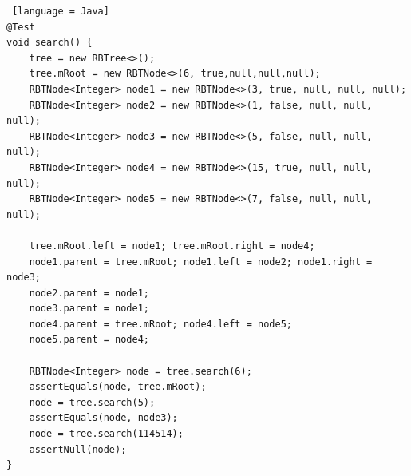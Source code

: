 \documentclass[12pt, a4paper, oneside]{ctexart}
\begin{document}
\begin{lstlisting} [language = Java]
@Test
void search() {
    tree = new RBTree<>();
    tree.mRoot = new RBTNode<>(6, true,null,null,null);
    RBTNode<Integer> node1 = new RBTNode<>(3, true, null, null, null);
    RBTNode<Integer> node2 = new RBTNode<>(1, false, null, null, null);
    RBTNode<Integer> node3 = new RBTNode<>(5, false, null, null, null);
    RBTNode<Integer> node4 = new RBTNode<>(15, true, null, null, null);
    RBTNode<Integer> node5 = new RBTNode<>(7, false, null, null, null);

    tree.mRoot.left = node1; tree.mRoot.right = node4;
    node1.parent = tree.mRoot; node1.left = node2; node1.right = node3;
    node2.parent = node1;
    node3.parent = node1;
    node4.parent = tree.mRoot; node4.left = node5;
    node5.parent = node4;

    RBTNode<Integer> node = tree.search(6);
    assertEquals(node, tree.mRoot);
    node = tree.search(5);
    assertEquals(node, node3);
    node = tree.search(114514);
    assertNull(node);
}
\end{lstlisting}
\end{document}
